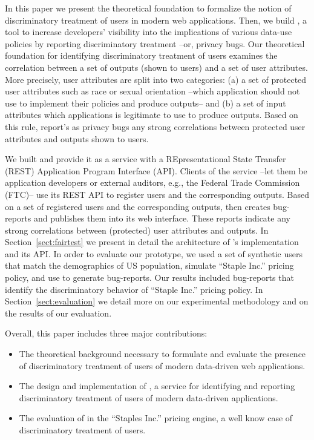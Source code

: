 In this paper we present the theoretical foundation to formalize the notion of
discriminatory treatment of users in modern web applications. Then, we build
\sysname, a tool to increase developers’ visibility into the implications of
various data-use policies by reporting discriminatory treatment --or,
privacy bugs. Our theoretical foundation for identifying discriminatory
treatment of users examines the correlation between a set of outputs (shown to
users) and a set of user attributes. More precisely, user attributes are split
into two categories: (a) a set of protected user attributes such as race or
sexual orientation --which application should not use to implement their
policies and produce outputs-- and (b) a set of input attributes which
applications is legitimate to use to produce outputs. Based on this rule,
\sysname report's as privacy bugs any strong correlations between protected
user attributes and outputs shown to users.

We built \sysname and provide it as a service with a REpresentational
State Transfer (REST) Application Program Interface (API). Clients of the 
\sysname service --let them be application developers or external auditors, e.g.,
the Federal Trade Commission (FTC)-- use its REST API to register users and the
corresponding outputs. Based on a set of registered users and the corresponding
outputs, \sysname then creates bug-reports and publishes them into its web interface.
These reports indicate any strong correlations between (protected) user attributes
and outputs. In Section~\ref{sect:fairtest} we present in detail the architecture
of \sysname's implementation and its API. In order to evaluate our \sysname
prototype, we used a set of synthetic users that match the demographics of
US population, simulate ``Staple Inc.'' pricing policy, and use \sysname to generate
bug-reports. Our results included bug-reports that identify the discriminatory behavior
of ``Staple  Inc.'' pricing policy. In Section~\ref{sect:evaluation} we detail more
on our experimental methodology and on the results of our evaluation.

Overall, this paper includes three major contributions:
\begin{itemize}
  \item The theoretical background necessary to formulate and evaluate the
    presence of discriminatory treatment of users of modern data-driven web
    applications.
  \item The design and implementation of \sysname, a service for identifying and
    reporting discriminatory treatment of users of modern data-driven applications.
  \item The evaluation of \sysname in the ``Staples Inc.'' pricing engine, a well
    know case of discriminatory treatment of users.
\end{itemize}

